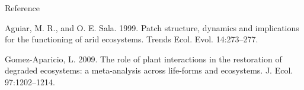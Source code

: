 \documentclass[letterpaper]{article}
\begin{document}
\newpage
Reference


Aguiar, M. R., and O. E. Sala. 1999. Patch structure, dynamics and implications for the functioning of arid ecosystems. Trends Ecol. Evol. 14:273–277.

Gomez-Aparicio, L. 2009. The role of plant interactions in the restoration of degraded ecosystems: a meta-analysis across life-forms and ecosystems. J. Ecol. 97:1202–1214.
\end{document}
